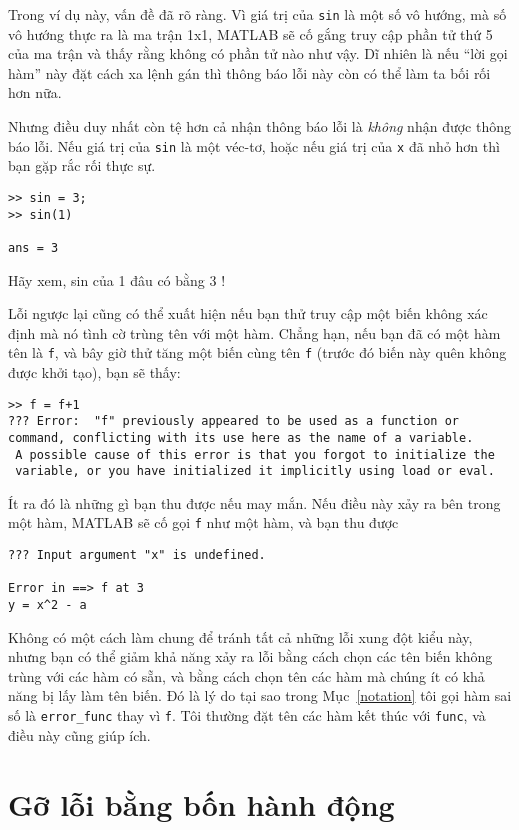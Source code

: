 \documentclass[12pt]{book}
\begin{document}
Trong ví dụ này, vấn đề đã rõ ràng. Vì giá trị của {\tt sin} là
một số vô hướng, mà số vô hướng thực ra là ma trận 1x1, MATLAB sẽ
cố gắng truy cập phần tử thứ 5 của ma trận và thấy rằng không có
phần tử nào như vậy. Dĩ nhiên là nếu ``lời gọi hàm'' này đặt cách xa
lệnh gán thì thông báo lỗi này còn có thể làm ta bối rối hơn nữa.

Nhưng điều duy nhất còn tệ hơn cả nhận thông báo lỗi là {\em không}
nhận được thông báo lỗi. Nếu giá trị của {\tt sin} là một véc-tơ,
hoặc nếu giá trị của {\tt x} đã nhỏ hơn thì bạn gặp rắc rối thực sự.

\begin{verbatim}
>> sin = 3;
>> sin(1)

ans = 3
\end{verbatim}

Hãy xem, sin của 1 đâu có bằng 3 !

Lỗi ngược lại cũng có thể xuất hiện nếu bạn thử truy cập một biến
không xác định mà nó tình cờ trùng tên với một hàm. Chẳng hạn, nếu
bạn đã có một hàm tên là {\tt f}, và bây giờ thử tăng một biến
cùng tên {\tt f} (trước đó biến này quên không được khởi tạo), bạn
sẽ thấy:

\begin{verbatim}
>> f = f+1
??? Error:  "f" previously appeared to be used as a function or 
command, conflicting with its use here as the name of a variable.
 A possible cause of this error is that you forgot to initialize the
 variable, or you have initialized it implicitly using load or eval.
\end{verbatim}

Ít ra đó là những gì bạn thu được nếu may mắn. Nếu điều này xảy ra
bên trong một hàm, MATLAB sẽ cố gọi {\tt f} như một hàm, và bạn
thu được

\begin{verbatim}
??? Input argument "x" is undefined.

Error in ==> f at 3
y = x^2 - a
\end{verbatim}

Không có một cách làm chung để tránh tất cả những lỗi xung đột
kiểu này, nhưng bạn có thể giảm khả năng xảy ra lỗi bằng cách chọn
các tên biến không trùng với các hàm có sẵn, và bằng cách chọn tên
các hàm mà chúng ít có khả năng bị lấy làm tên biến. Đó là lý do
tại sao trong Mục~\ref{notation} tôi gọi hàm sai số là
\verb#error_func# thay vì {\tt f}.  Tôi thường đặt tên các hàm
kết thúc với {\tt func}, và điều này cũng giúp ích.


\section{Gỡ lỗi bằng bốn hành động}
\end{document}
